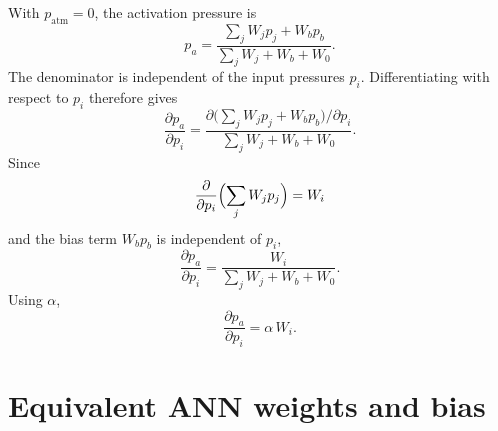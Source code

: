 \documentclass[11pt,a4paper]{article}
\numberwithin{equation}{section}
\newcommand{\patm}{p_{\mathrm{atm}}}
\begin{document}
\begin{appendices}
With $\patm = 0$, the activation pressure is
\begin{equation}
  p_a = \frac{\sum_j W_j p_j + W_b p_b}{\sum_j W_j + W_b + W_0} .
\end{equation}
The denominator is independent of the input pressures $p_i$. Differentiating with respect to $p_i$ therefore gives
\begin{equation}
  \frac{\partial p_a}{\partial p_i}
    = \frac{\partial\bigl(\sum_j W_j p_j + W_b p_b\bigr)/\partial p_i}{\sum_j W_j + W_b + W_0} .
\end{equation}
Since
\begin{equation}
  \frac{\partial}{\partial p_i}\Bigl(\sum_j W_j p_j\Bigr) = W_i
\end{equation}
and the bias term $W_b p_b$ is independent of $p_i$,
\begin{equation}
  \frac{\partial p_a}{\partial p_i} = \frac{W_i}{\sum_j W_j + W_b + W_0} .
\end{equation}
Using $\alpha$,
\begin{equation}
  \boxed{\frac{\partial p_a}{\partial p_i} = \alpha\,W_i} .
\end{equation}

\section{Equivalent ANN weights and bias}
\label{app:ann}


\end{appendices}
\end{document}
